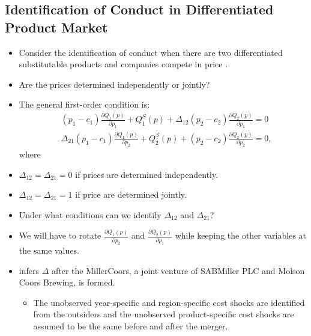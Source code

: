 \documentclass[
]{book}
\providecommand{\tightlist}{%
  \setlength{\itemsep}{0pt}\setlength{\parskip}{0pt}}
\begin{document}
\hypertarget{identification-of-conduct-in-differentiated-product-market}{%
\subsection{Identification of Conduct in Differentiated Product Market}\label{identification-of-conduct-in-differentiated-product-market}}

\begin{itemize}
\item
  Consider the identification of conduct when there are two differentiated substitutable products and companies compete in price \citep{Nevo1998}.
\item
  Are the prices determined independently or jointly?
\item
  The general first-order condition is:
  \begin{equation}
  \begin{split}
  &(p_1 - c_1) \frac{\partial Q_1(p)}{\partial p_1} + Q_1^S(p) + \Delta_{12}(p_2 - c_2) \frac{\partial Q_2 (p)}{\partial p_1} = 0\\
  &\Delta_{21}(p_1 - c_1)\frac{\partial Q_1(p)}{\partial p_2} + Q_2^S(p) + (p_2 - c_2) \frac{\partial Q_2 (p)}{\partial p_2} = 0,
  \end{split}
  \end{equation}
  where
\item
  \(\Delta_{12} = \Delta_{21} = 0\) if prices are determined independently.
\item
  \(\Delta_{12} = \Delta_{21} = 1\) if price are determined jointly.
\item
  Under what conditions can we identify \(\Delta_{12}\) and \(\Delta_{21}\)?
\item
  We will have to rotate \(\frac{\partial Q_1(p)}{\partial p_2}\) and \(\frac{\partial Q_2 (p)}{\partial p_1}\) while keeping the other variables at the same values.
\item
  \citet{Miller2017} infers \(\Delta\) after the MillerCoors, a joint venture of SABMiller PLC and Molson Coors Brewing, is formed.

  \begin{itemize}
  \tightlist
  \item
    The unobserved year-specific and region-specific cost shocks are identified from the outsiders and the unobserved product-specific cost shocks are assumed to be the same before and after the merger.
  \end{itemize}
\end{itemize}
\end{document}
